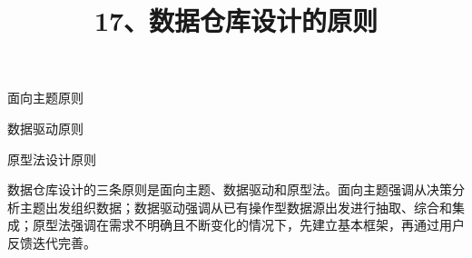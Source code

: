 \documentclass[UTF8,zihao=-4]{ctexart}
\begin{document}
\title{17、数据仓库设计的原则}
\author{}
\date{}
\maketitle

面向主题原则\par
数据驱动原则\par
原型法设计原则\par

数据仓库设计的三条原则是面向主题、数据驱动和原型法。面向主题强调从决策分析主题出发组织数据；数据驱动强调从已有操作型数据源出发进行抽取、综合和集成；原型法强调在需求不明确且不断变化的情况下，先建立基本框架，再通过用户反馈迭代完善。\par
\end{document}
